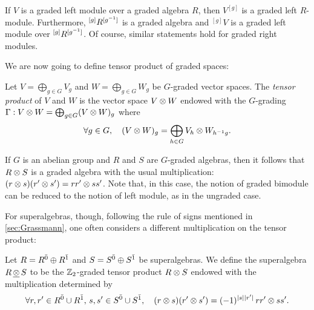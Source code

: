 If $V$ is a graded left module over a graded algebra $R$, then $V^{[g]}$ is a graded left $R$-module. 
Furthermore, ${}^{[g]} R ^{[g^{-1}]}$ is a graded algebra and ${}^{[g]}V$ is a graded left module over ${}^{[g]} R ^{[g^{-1}]}$. 
Of course, similar statements hold for graded right modules. 





We are now going to define tensor product of graded spaces:

\begin{defi}\label{defi:tensorProduct}
    Let $V=\bigoplus_{g\in G} V_g$ and $W=\bigoplus_{g\in G} W_g$ be $G$-graded vector spaces. 
    The \emph{tensor product} of $V$ and $W$ is the vector space $V \otimes W$ endowed with the $G$-grading $\Gamma : V \otimes W = \bigoplus_{g\in G} (V \otimes W)_g$ where
    \[
        \forall g\in G, \quad (V \otimes W)_g = \bigoplus_{h\in G} V_{h} \otimes W_{h^{-1} g}.
    \]
\end{defi}

\label{defi:tensor-algebras}

If $G$ is an abelian group and $R$ and $S$ are $G$-graded algebras, then it follows that $R \otimes S$ is a graded algebra with the usual multiplication: $(r \otimes s) (r' \otimes s') = rr' \otimes ss'$. 
Note that, in this case, the notion of graded bimodule can be reduced to the notion of left module, as in the ungraded case. 


For superalgebras, though, following the rule of signs mentioned in \cref{sec:Grassmann}, one often considers a different multiplication on the tensor product:

\begin{defi}\label{defi:tensorSuperalgebras}
    Let $R = R^{\bar0} \oplus R^{\bar1}$ and $S = S^{\bar0} \oplus S^{\bar1}$ be superalgebras. 
    We define the superalgebra $R\, \underline{\otimes} \, S$ to be the $\mathbb{Z}_2$-graded tensor product $R \otimes S$ endowed with the multiplication determined by
    \[
        \forall r, r' \in R^{\bar0} \cup R^{\bar1}, \, s,s' \in S^{\bar0} \cup S^{\bar1}, \quad 
        (r \otimes s) (r' \otimes s')
        = (-1)^{|s||r'|} \, rr' \otimes ss'.
    \]
\end{defi}

